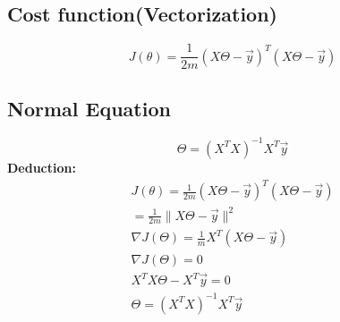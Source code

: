 \documentclass{article}
\begin{document}
\subsection{Cost function(Vectorization)}
$$J(\theta)=\frac{1}{2m}(X\Theta-\vec{y})^T(X\Theta-\vec{y})$$

\subsection{Normal Equation}
$$\Theta = (X^TX)^{-1}X^T\vec{y}$$
\textbf{Deduction:}
	\begin{eqnarray}
		J(\theta)=\frac{1}{2m}(X\Theta-\vec{y})^T(X\Theta-\vec{y})\nonumber\\
			=\frac{1}{2m}\lVert X\Theta - \vec{y}\rVert^2 \nonumber\\
		\nabla J(\Theta)=\frac{1}{m}X^T(X\Theta-\vec{y})\nonumber\\
		\nabla J(\Theta)=0 \nonumber \\
		X^TX\Theta-X^T\vec{y}=0 \nonumber \\
		\Theta = (X^TX)^{-1}X^T\vec{y} \nonumber
	\end{eqnarray}	
\end{document}
